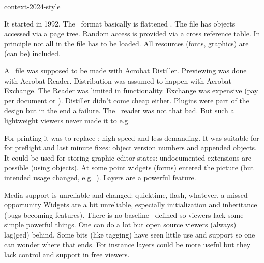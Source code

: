 
\environment context-2024-style

\startdocument
  [title={PDF 2.0},
   banner={what does it mean for us},
   location={context\enspace {\bf 2024}\enspace meeting}]

\starttitle[title=Short history]

\startitemize
\startitem It started in 1992. \stopitem
\startitem The \PDF\ format basically is flattened \POSTSCRIPT. \stopitem
\startitem The file has objects accessed via a page tree. \stopitem
\startitem Random access is provided via a cross reference table. \stopitem
\startitem In principle not all in the file has to be loaded. \stopitem
\startitem All resources (fonts, graphics) are (can be) included. \stopitem
\stopitemize

\stoptitle

\starttitle[title=The tools]

\startitemize
\startitem A \PDF\ file was supposed to be made with Acrobat Distiller. \stopitem
\startitem Previewing was done with Acrobat Reader. \stopitem
\startitem Distribution was assumed to happen with Acrobat Exchange. \stopitem
\startitem The Reader was limited in functionality. \stopitem
\startitem Exchange was expensive (pay per document or \CD).\stopitem
\startitem Distiller didn't come cheap either. \stopitem
\startitem Plugins were part of the design but in the end a failure. \stopitem
\startitem The \MSDOS\ reader was not that bad. \stopitem
\startitem But such a lightweight viewers never made it to e.g.\ \LINUX \stopitem
\stopitemize

\stoptitle

\starttitle[title=Usage]

\startitemize
\startitem For printing it was to replace \POSTSCRIPT: high speed and less demanding. \stopitem
\startitem It was suitable for for preflight and last minute fixes: object version numbers and appended objects. \stopitem
\startitem It could be used for storing graphic editor states: undocumented extensions are possible (using objects). \stopitem
\startitem At some point widgets (forms) entered the picture (but intended usage changed, e.g.\ \FDF). \stopitem
\startitem Layers are a powerful feature. \stopitem
\stopitemize

\stoptitle

\starttitle[title=Usability]

\startitemize
\startitem Media support is unreliable and changed: quicktime, flash, whatever, a missed opportunity \stopitem
\startitem Widgets are a bit unreliable, especially initialization and inheritance (bugs becoming features). \stopitem
\startitem There is no baseline \JAVASCRIPT\ defined so viewers lack some simple powerful things. \stopitem
\startitem One can do a lot but open source viewers (always) lag(ged) behind. \stopitem
\startitem Some bits (like tagging) have seen little use and support so one can wonder where that ends. \stopitem
\startitem For instance layers could be more useful but they lack control and support in free viewers. \stopitem
\stopitemize

